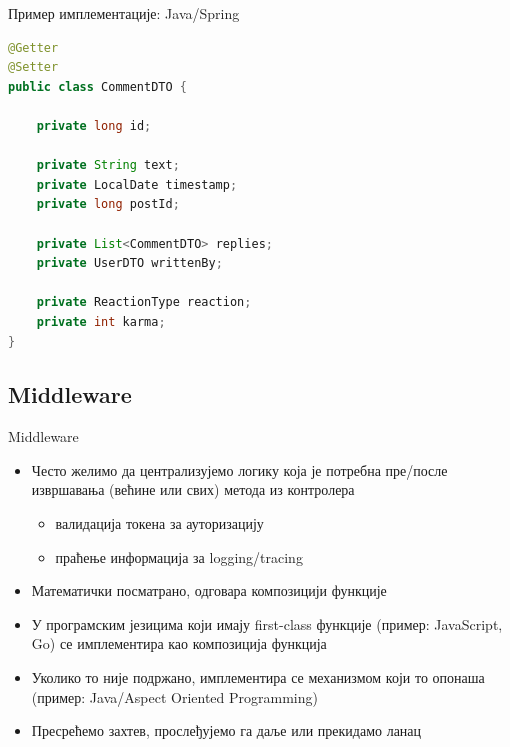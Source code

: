 \documentclass{beamer}
\begin{document}
    \begin{frame}[fragile]{Пример имплементације: Java/Spring}
        \begin{adjustbox}{width=\textwidth,height=\textheight,keepaspectratio}
			\begin{lstlisting}[language=java]
@Getter
@Setter
public class CommentDTO {

    private long id;

    private String text;
    private LocalDate timestamp;
    private long postId;

    private List<CommentDTO> replies;
    private UserDTO writtenBy;

    private ReactionType reaction;
    private int karma;
}
			\end{lstlisting}
		\end{adjustbox}
    \end{frame}
    
    \subsection{Middleware}
    
    \begin{frame}{Middleware}
        \begin{itemize}
			\item Често желимо да централизујемо логику која је потребна пре/после извршавања (већине или свих) метода из контролера
			\begin{itemize}
				\item валидација токена за ауторизацију
				\item праћење информација за logging/tracing
        	\end{itemize}
			\item Математички посматрано, одговара композицији функције
			\item У програмским језицима који имају first-class функције (пример: JavaScript, Go) се имплементира као композиција функција
			\item Уколико то није подржано, имплементира се механизмом који то опонаша (пример: Java/Aspect Oriented Programming)
			\item Пресрећемо захтев, прослеђујемо га даље или прекидамо ланац
        \end{itemize}
    \end{frame}
    
\end{document}
